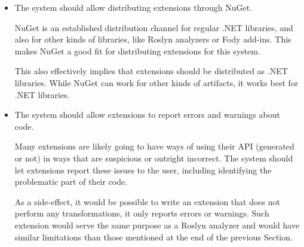 \begin{itemize}
\item The system should allow distributing extensions through NuGet.

NuGet is an established distribution channel for regular .NET libraries, and also for other kinds of libraries, like Roslyn analyzers or Fody add-ins. This makes NuGet a good fit for distributing extensions for this system.

\label{extensions-are-dotnet-libraries}

This also effectively implies that extensions should be distributed as .NET libraries. While NuGet can work for other kinds of artifacts, it works best for .NET libraries.

\item The system should allow extensions to report errors and warnings about code.

Many extensions are likely going to have ways of using their \ac{API} (generated or not) in ways that are suspicious or outright incorrect. The system should let extensions report these issues to the user, including identifying the problematic part of their code.

As a side-effect, it would be possible to write an extension that does not perform any transformations, it only reports errors or warnings. Such extension would serve the same purpose as a Roslyn analyzer and would have similar limitations than those mentioned at the end of the previous Section.



\end{itemize}
